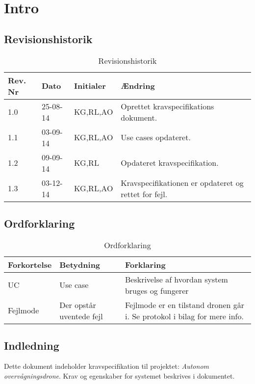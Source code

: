 \chapter{Intro}

\section{Revisionshistorik}
\begin{table}[H]
	\centering
		\begin{tabular}{|p{2 cm}|p{2 cm}|p{3 cm}|p{6 cm}|} 
		\hline
			\textbf{Rev. Nr} & \textbf{Dato}		& \textbf{Initialer} 	& \textbf{Ændring} \\ \hline
			1.0 	& 25-08-14	& KG,RL,AO		& Oprettet kravspecifikations \newline dokument.	\\ \hline
			1.1 	& 03-09-14	& KG,RL,AO		& Use cases opdateret.\\ \hline
			1.2 	& 09-09-14	& KG,RL			& Opdateret kravspecifikation.\\ \hline
			1.3 	& 03-12-14	& KG,RL,AO		& Kravspecifikationen er opdateret og rettet for fejl.\\ \hline
		\end{tabular}
	\caption{Revisionshistorik}
\end{table}

\vspace{1.5cm}

\section{Ordforklaring}
\begin{table}[H]
	\centering
		\begin{tabular}{|p{2.5cm}|p{4.5 cm}|p{6.5 cm}|} 
		\hline
			\textbf{Forkortelse} & \textbf{Betydning} & \textbf{Forklaring} \\ \hline
			UC & Use case & Beskrivelse af hvordan system bruges og fungerer \\ \hline
			Fejlmode & Der opstår uventede fejl & Fejlmode er en tilstand dronen går i. \newline Se protokol i bilag for mere info. \\ \hline
		\end{tabular}
	\caption{Ordforklaring}
\end{table}

\vspace{4cm}

\section{Indledning}

Dette dokument indeholder kravspecifikation til projektet: \textit{Autonom overvågningsdrone}. Krav og egenskaber for systemet beskrives i dokumentet.